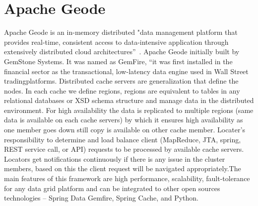 \section{Apache Geode}

Apache Geode is an in-memory distributed "data management platform that provides real-time, 
consistent access to data-intensive application through extensively distributed cloud 
architectures”~\cite{hid-sp18-514-apachegeodewiki}. Apache Geode initially built by GemStone Systems. 
It was named as GemFire, “it was first installed in the financial sector as the transactional, 
low-latency data engine used in Wall Street tradingplatforms.
Distributed cache servers are generalization that define the nodes. In each cache we define regions, 
regions are equivalent to tables in any relational databases or XSD schema structure and manage data in the distributed environment. 
For high availability the data is replicated to multiple regions (same data is available on each cache servers) by which it ensures 
high availability as one member goes down still copy is available on other cache member. Locater’s responsibility to determine 
and load balance client (MapReduce, JTA, spring, REST service call, or API) requests to be processed by available cache servers.
Locators get notifications continuously if there is any issue in the cluster members, based on this the client request will
be navigated appropriately\cite{hid-sp18-514-apachegeodewiki}.The main features of this framework are high performance, 
scalability, fault-tolerance for any data grid platform and can be integrated to other open sources 
technologies – Spring Data Gemfire\cite{hid-sp18-514-geodespringgemfire},
Spring Cache\cite{hid-sp18-514-geodespringcache}, and Python\cite{hid-sp18-514-geodepython}.
